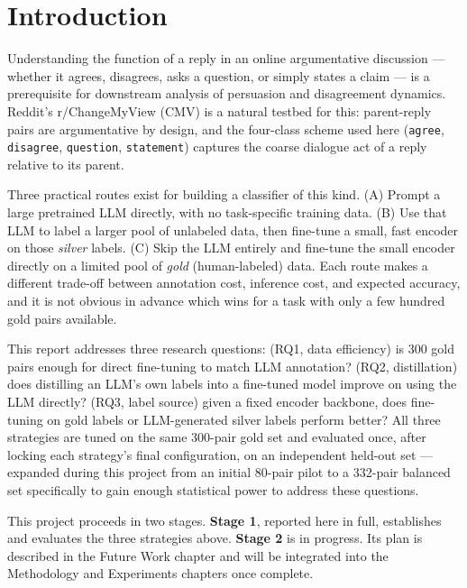 \chapter{Introduction}
\label{k:einleitung}

Understanding the function of a reply in an online argumentative discussion
--- whether it agrees, disagrees, asks a question, or simply states a claim
--- is a prerequisite for downstream analysis of persuasion and disagreement
dynamics. Reddit's r/ChangeMyView (CMV) is a natural testbed for this:
parent-reply pairs are argumentative by design, and the four-class scheme
used here (\texttt{agree}, \texttt{disagree}, \texttt{question},
\texttt{statement}) captures the coarse dialogue act of a reply relative to
its parent.

Three practical routes exist for building a classifier of this kind.
(A) Prompt a large pretrained LLM directly, with no task-specific training
data. (B) Use that LLM to label a larger pool of unlabeled data, then
fine-tune a small, fast encoder on those \emph{silver} labels. (C) Skip
the LLM entirely and fine-tune the small encoder directly on a limited
pool of \emph{gold} (human-labeled) data. Each route makes a different
trade-off
between annotation cost, inference cost, and expected accuracy, and it is
not obvious in advance which wins for a task with only a few hundred gold
pairs available.

This report addresses three research questions: (RQ1, data efficiency) is
300 gold pairs enough for direct fine-tuning to match LLM annotation? (RQ2,
distillation) does distilling an LLM's own labels into a fine-tuned model
improve on using the LLM directly? (RQ3, label source) given a fixed
encoder backbone, does fine-tuning on gold labels or LLM-generated silver
labels perform better? All three strategies are tuned on the same
300-pair gold set and evaluated once, after locking each strategy's final
configuration, on an independent held-out set --- expanded during this
project from an initial 80-pair pilot to a 332-pair balanced set
specifically to gain enough statistical power to address these questions.

This project proceeds in two stages. \textbf{Stage 1}, reported here in
full, establishes and evaluates the three strategies above. \textbf{Stage 2}
is in progress. Its plan is described in the Future Work chapter and will
be integrated into the Methodology and Experiments chapters once complete.


